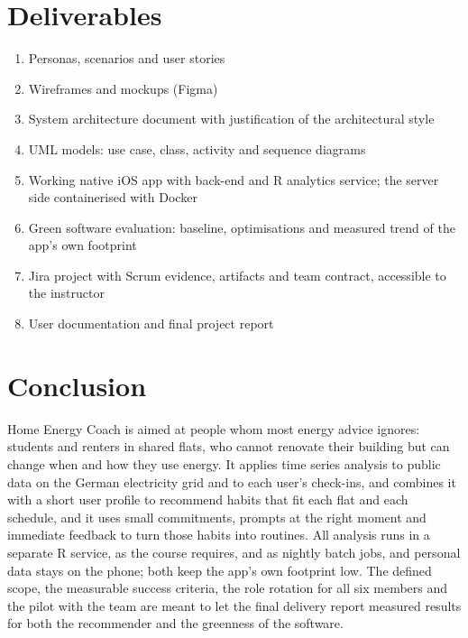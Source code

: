 \documentclass[conference]{IEEEtran}
\begin{document}
\section{Deliverables}
\begin{enumerate}
\item Personas, scenarios and user stories
\item Wireframes and mockups (Figma)
\item System architecture document with justification of the architectural style
\item UML models: use case, class, activity and sequence diagrams
\item Working native iOS app with back-end and R analytics service; the server side containerised with Docker
\item Green software evaluation: baseline, optimisations and measured trend of the app's own footprint
\item Jira project with Scrum evidence, artifacts and team contract, accessible to the instructor
\item User documentation and final project report
\end{enumerate}

\section{Conclusion}
Home Energy Coach is aimed at people whom most energy advice ignores: students and renters in shared flats, who cannot renovate their building but can change when and how they use energy. It applies time series analysis to public data on the German electricity grid and to each user's check-ins, and combines it with a short user profile to recommend habits that fit each flat and each schedule, and it uses small commitments, prompts at the right moment and immediate feedback to turn those habits into routines. All analysis runs in a separate R service, as the course requires, and as nightly batch jobs, and personal data stays on the phone; both keep the app's own footprint low. The defined scope, the measurable success criteria, the role rotation for all six members and the pilot with the team are meant to let the final delivery report measured results for both the recommender and the greenness of the software.
\end{document}
